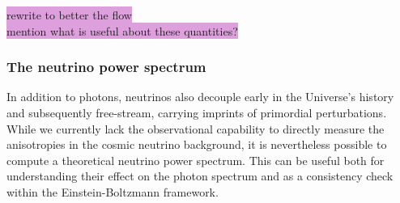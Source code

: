 \documentclass{aa}
\numberwithin{equation}{section}
\numberwithin{table}{section}
\numberwithin{figure}{section}
\begin{document}
\colorbox{Plum}{rewrite to better the flow} \\
\colorbox{Plum}{mention what is useful about these quantities?}





\subsubsection{The neutrino power spectrum}
In addition to photons, neutrinos also decouple early in the Universe's history and subsequently free-stream, carrying imprints of primordial perturbations. While we currently lack the observational capability to directly measure the anisotropies in the cosmic neutrino background, it is nevertheless possible to compute a theoretical neutrino power spectrum. This can be useful both for understanding their effect on the photon spectrum and as a consistency check within the Einstein-Boltzmann framework.

\end{document}
